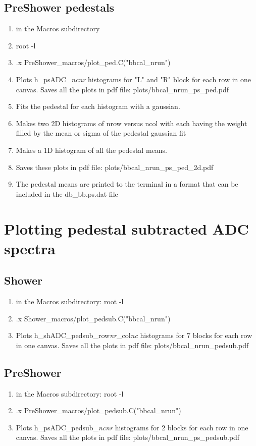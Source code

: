 \documentclass[]{article}
\begin{document}
\subsection{PreShower pedestals}
\begin{enumerate}
	\item in the Macros subdirectory
	\item root -l
	\item .x PreShower\_macros/plot\_ped.C("bbcal\_nrun")
	\item Plots  h\_psADC\_{\it nc}{\it nr} histograms for "L" and "R" block for each row in one canvas. Saves all the plots in pdf file: plots/bbcal\_nrun\_ps\_ped.pdf
	\item Fits the pedestal for each histogram with a gaussian.
	\item Makes two 2D histograms of nrow versus ncol with each having the weight filled by the mean or sigma of the pedestal gaussian fit
	\item Makes a 1D histogram of all the pedestal means.
	\item Saves these plots in pdf file: plots/bbcal\_nrun\_ps\_ped\_2d.pdf
	\item The pedestal means are printed to the terminal in a format that can be included in the db\_bb.ps.dat file
\end{enumerate}
\section{Plotting pedestal subtracted ADC spectra}
\subsection{Shower}
\begin{enumerate}
	\item in the Macros subdirectory: root -l
	\item .x Shower\_macros/plot\_pedsub.C("bbcal\_nrun")
	\item Plots  h\_shADC\_pedsub\_row{\it nr}\_col{\it nc} histograms for 7 blocks for each row in one canvas. Saves all the plots in pdf file: plots/bbcal\_nrun\_pedsub.pdf
\end{enumerate}
\subsection{PreShower}
\begin{enumerate}
	\item in the Macros subdirectory:  root -l
	\item .x PreShower\_macros/plot\_pedsub.C("bbcal\_nrun")
	\item Plots  h\_psADC\_pedsub\_{\it nc}{\it nr} histograms for 2 blocks for each row in one canvas. Saves all the plots in pdf file: plots/bbcal\_nrun\_ps\_pedsub.pdf
\end{enumerate}
\end{document}
